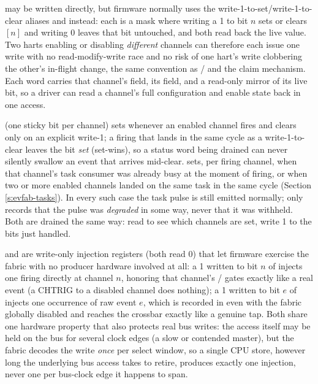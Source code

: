  may be written directly, but firmware normally uses the write-1-to-set/write-1-to-clear aliases  and  instead: each is a mask where writing a 1 to bit $n$ sets or clears $[n]$ and writing 0 leaves that bit untouched, and both read back the live  value. Two harts enabling or disabling \textit{different} channels can therefore each issue one write with no read-modify-write race and no risk of one hart's write clobbering the other's in-flight change, the same convention as / and the  claim mechanism. Each  word carries that channel's  field, its  field, and a read-only  mirror of its live  bit, so a driver can read a channel's full configuration and enable state back in one access.

 (one sticky bit per channel) sets whenever an enabled channel fires and clears only on an explicit write-1; a firing that lands in the same cycle as a write-1-to-clear leaves the bit \textit{set} (set-wins), so a status word being drained can never silently swallow an event that arrives mid-clear.  sets, per firing channel, when that channel's task consumer was already busy at the moment of firing, or when two or more enabled channels landed on the same task in the same cycle (Section \ref{s:evfab-tasks}). In every such case the task pulse is still emitted normally;  only records that the pulse was \textit{degraded} in some way, never that it was withheld. Both are drained the same way: read to see which channels are set, write 1 to the bits just handled.

 and  are write-only injection registers (both read 0) that let firmware exercise the fabric with no producer hardware involved at all: a 1 written to bit $n$ of  injects one firing directly at channel $n$, honoring that channel's / gates exactly like a real event (a CHTRIG to a disabled channel does nothing); a 1 written to bit $e$ of  injects one occurrence of raw event $e$, which is recorded in  even with the fabric globally disabled and reaches the crossbar exactly like a genuine tap. Both share one hardware property that also protects real bus writes: the access itself may be held on the bus for several clock edges (a slow or contended master), but the fabric decodes the write \textit{once} per select window, so a single CPU store, however long the underlying bus access takes to retire, produces exactly one injection, never one per bus-clock edge it happens to span.

